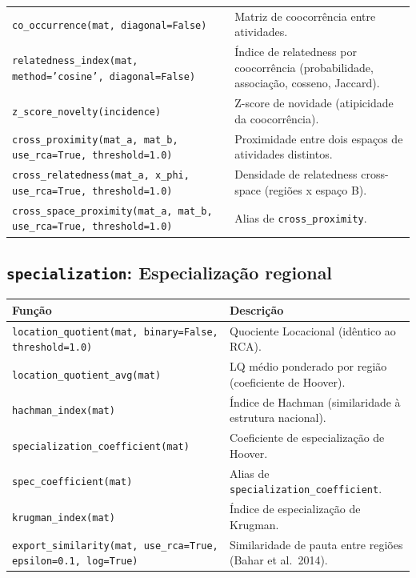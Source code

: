 \begin{longtable}{>{\raggedright\arraybackslash}p{9.2cm} >{\raggedright\arraybackslash}p{7.0cm}}
\texttt{\footnotesize co\_occurrence(mat, diagonal=False)} & {\small Matriz de coocorr\^{e}ncia entre atividades.} \\[2pt]
\texttt{\footnotesize relatedness\_index(mat, method='cosine', diagonal=False)} & {\small \'{I}ndice de relatedness por coocorr\^{e}ncia (probabilidade, associa\c{c}\~{a}o, cosseno, Jaccard).} \\[2pt]
\texttt{\footnotesize z\_score\_novelty(incidence)} & {\small Z-score de novidade (atipicidade da coocorr\^{e}ncia).} \\[2pt]
\texttt{\footnotesize cross\_proximity(mat\_a, mat\_b, use\_rca=True, threshold=1.0)} & {\small Proximidade entre dois espa\c{c}os de atividades distintos.} \\[2pt]
\texttt{\footnotesize cross\_relatedness(mat\_a, x\_phi, use\_rca=True, threshold=1.0)} & {\small Densidade de relatedness cross-space (regi\~{o}es x espa\c{c}o B).} \\[2pt]
\texttt{\footnotesize cross\_space\_proximity(mat\_a, mat\_b, use\_rca=True, threshold=1.0)} & {\small Alias de \texttt{cross\_proximity}.} \\[2pt]
\bottomrule
\end{longtable}

\subsection{\texttt{specialization}: Especializa\c{c}\~{a}o regional}
\begin{longtable}{>{\raggedright\arraybackslash}p{9.2cm} >{\raggedright\arraybackslash}p{7.0cm}}
\toprule
\textbf{Fun\c{c}\~{a}o} & \textbf{Descri\c{c}\~{a}o} \\
\midrule\endhead
\texttt{\footnotesize location\_quotient(mat, binary=False, threshold=1.0)} & {\small Quociente Locacional (id\^{e}ntico ao RCA).} \\[2pt]
\texttt{\footnotesize location\_quotient\_avg(mat)} & {\small LQ m\'{e}dio ponderado por regi\~{a}o (coeficiente de Hoover).} \\[2pt]
\texttt{\footnotesize hachman\_index(mat)} & {\small \'{I}ndice de Hachman (similaridade \`{a} estrutura nacional).} \\[2pt]
\texttt{\footnotesize specialization\_coefficient(mat)} & {\small Coeficiente de especializa\c{c}\~{a}o de Hoover.} \\[2pt]
\texttt{\footnotesize spec\_coefficient(mat)} & {\small Alias de \texttt{specialization\_coefficient}.} \\[2pt]
\texttt{\footnotesize krugman\_index(mat)} & {\small \'{I}ndice de especializa\c{c}\~{a}o de Krugman.} \\[2pt]
\texttt{\footnotesize export\_similarity(mat, use\_rca=True, epsilon=0.1, log=True)} & {\small Similaridade de pauta entre regi\~{o}es (Bahar et al.\ 2014).} \\[2pt]
\bottomrule
\end{longtable}

